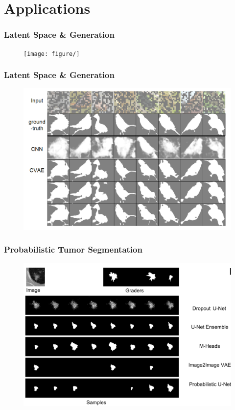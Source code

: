 \documentclass[10pt,mathserif]{beamer}
\begin{document}
\section{Applications}
\label{sec:applications}

\begin{frame}
  \frametitle{Latent Space & Generation}
\begin{figure}[ht]
  \centering
  \texttt{[image: figure/]}
  \caption{\label{fig:} }
\end{figure}
\end{frame}

\begin{frame}
  \frametitle{Latent Space & Generation}
\begin{figure}[ht]
  \centering
  \includegraphics[width=0.6\paperwidth]{figure/vae_conditional}
  \caption{\label{fig:vae_conditional} }
\end{figure}
\end{frame}

\begin{frame}
  \frametitle{Probabilistic Tumor Segmentation}
\begin{figure}[ht]
  \centering
  \includegraphics[width=0.6\paperwidth]{figure/vae_unet}
  \caption{\label{fig:vae_unet} }
\end{figure}
\end{frame}
\end{document}
